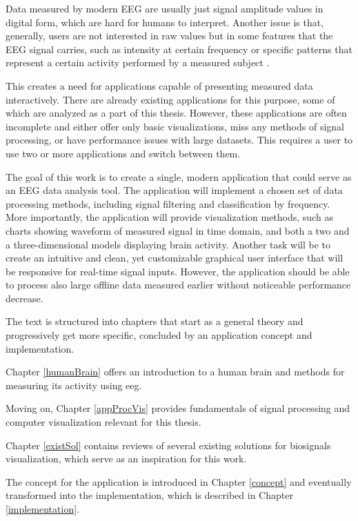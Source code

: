 Data measured by modern EEG are usually just signal amplitude values in digital form, which are hard for humans to interpret. Another issue is that, generally, users are not interested in raw values but in some features that the EEG signal carries, such as intensity at certain frequency or specific patterns that represent a certain activity performed by a measured subject \cite{eegClass}. 

This creates a need for applications capable of presenting measured data interactively. There are already existing applications for this purpose, some of which are analyzed as a part of this thesis. However, these applications are often incomplete and either offer only basic visualizations, miss any methods of signal processing, or have performance issues with large datasets. This requires a user to use two or more applications and switch between them.

The goal of this work is to create a single, modern application that could serve as an EEG data analysis tool. The application will implement a chosen set of data processing methods, including signal filtering and classification by frequency. More importantly, the application will provide visualization methods, such as charts showing waveform of measured signal in time domain, and both a two and a three-dimensional models displaying brain activity. Another task will be to create an intuitive and clean, yet customizable graphical user interface that will be responsive for real-time signal inputs. However, the application should be able to process also large offline data measured earlier without noticeable performance decrease.

The text is structured into chapters that start as a general theory and
progressively get more specific, concluded by an application concept and
implementation. 

Chapter \ref{humanBrain} offers an introduction to a human brain and methods for measuring its activity using \gls{eeg}.

Moving on, Chapter \ref{appProcVis} provides fundamentals of signal processing and computer visualization relevant for this thesis. 

Chapter \ref{existSol} contains reviews of several existing solutions for biosignals visualization, which serve as an inspiration for this work.

The concept for the application is introduced in Chapter \ref{concept} and eventually transformed into the implementation, which is described in Chapter \ref{implementation}.
 
